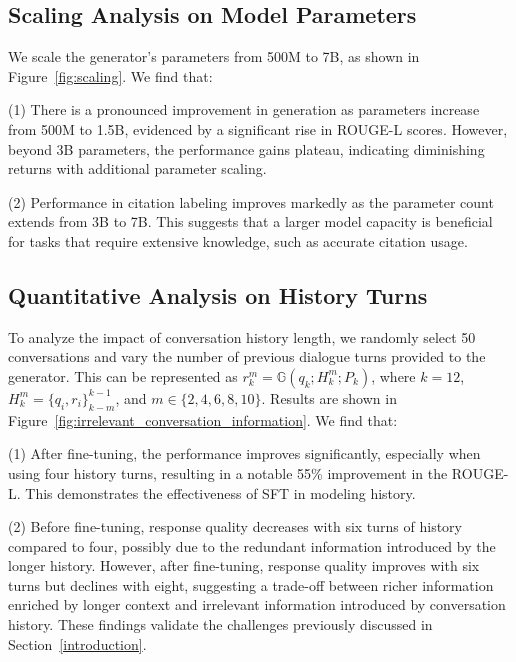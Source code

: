 \documentclass[11pt]{article}
\begin{document}
\subsection{Scaling Analysis on Model Parameters}
We scale the generator's parameters from 500M to 7B, as shown in Figure~\ref{fig:scaling}. We find that: 

(1) There is a pronounced improvement in generation as parameters increase from 500M to 1.5B, evidenced by a significant rise in ROUGE-L scores. 
However, beyond 3B parameters, the performance gains plateau, indicating diminishing returns with additional parameter scaling.

(2) Performance in citation labeling improves markedly as the parameter count extends from 3B to 7B. This suggests that a larger model capacity is beneficial for tasks that require extensive knowledge, such as accurate citation usage.


\subsection{Quantitative Analysis on History Turns}
To analyze the impact of conversation history length, we randomly select 50 conversations and vary the number of previous dialogue turns provided to the generator. This can be represented as $r_{k}^m=\mathbb{G}  \left ( q_{k};H_{k}^m;P_{k} \right ) $, where $k=12$, $H_{k}^m = \{ q_{i},r_{i}\}_{k-m}^{k-1} $, and $m \in \{2, 4, 6, 8, 10\}$. Results are shown in Figure~\ref{fig:irrelevant_conversation_information}. We find that:

(1) After fine-tuning, the performance improves significantly, especially when using four history turns, resulting in a notable 55\% improvement in the ROUGE-L. This demonstrates the effectiveness of SFT in modeling history.

(2) Before fine-tuning, response quality decreases with six turns of history compared to four, possibly due to the redundant information introduced by the longer history. However, after fine-tuning, response quality improves with six turns but declines with eight, suggesting a trade-off between richer information enriched by longer context and irrelevant information introduced by conversation history. These findings validate the challenges previously discussed in Section~\ref{introduction}.
\end{document}
